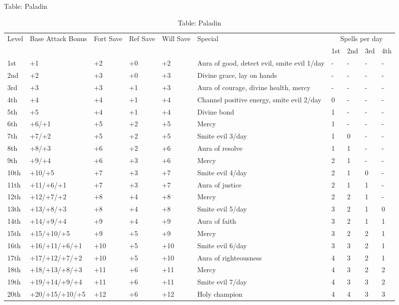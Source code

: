 Table: Paladin
\begin{table}[]
\sffamily
\caption{Table: Paladin}
\begin{tabularx}{\linewidth}{lllllXllll}
\multirow{2}{*}{Level} & \multirow{2}{*}{\parbox{5em}{Base Attack Bonus}} & \multirow{2}{*}{\parbox{1.5em}{Fort Save}} & \multirow{2}{*}{\parbox{1.5em}{Ref Save}} & \multirow{2}{*}{\parbox{1.5em}{Will Save}} & \multirow{2}{*}{Special}  & \multicolumn{4}{c}{Spells per day} \\
                       &                                    &                            &                           &                            &                                                                        & 1st  & 2nd & 3rd & 4th \\
\hline
1st & +1 & +2 & +0 & +2 & Aura of good, detect evil, smite evil 1/day & - & - & - & -\\
2nd & +2 & +3 & +0 & +3 & Divine grace, lay on hands & - & - & - & -\\
3rd & +3 & +3 & +1 & +3 & Aura of courage, divine health, mercy & - & - & - & -\\
4th & +4 & +4 & +1 & +4 & Channel positive energy, smite evil 2/day & 0 & - & - & -\\
5th & +5 & +4 & +1 & +4 & Divine bond & 1 & - & - & -\\
6th & +6/+1 & +5 & +2 & +5 & Mercy & 1 & - & - & -\\
7th & +7/+2 & +5 & +2 & +5 & Smite evil 3/day & 1 & 0 & - & -\\
8th & +8/+3 & +6 & +2 & +6 & Aura of resolve & 1 & 1 & - & -\\
9th & +9/+4 & +6 & +3 & +6 & Mercy & 2 & 1 & - & -\\
10th & +10/+5 & +7 & +3 & +7 & Smite evil 4/day & 2 & 1 & 0 & -\\
11th & +11/+6/+1 & +7 & +3 & +7 & Aura of justice & 2 & 1 & 1 & -\\
12th & +12/+7/+2 & +8 & +4 & +8 & Mercy & 2 & 2 & 1 & -\\
13th & +13/+8/+3 & +8 & +4 & +8 & Smite evil 5/day & 3 & 2 & 1 & 0\\
14th & +14/+9/+4 & +9 & +4 & +9 & Aura of faith & 3 & 2 & 1 & 1\\
15th & +15/+10/+5 & +9 & +5 & +9 & Mercy & 3 & 2 & 2 & 1\\
16th & +16/+11/+6/+1 & +10 & +5 & +10 & Smite evil 6/day & 3 & 3 & 2 & 1\\
17th & +17/+12/+7/+2 & +10 & +5 & +10 & Aura of righteousness & 4 & 3 & 2 & 1\\
18th & +18/+13/+8/+3 & +11 & +6 & +11 & Mercy & 4 & 3 & 2 & 2\\
19th & +19/+14/+9/+4 & +11 & +6 & +11 & Smite evil 7/day & 4 & 3 & 3 & 2\\
20th & +20/+15/+10/+5 & +12 & +6 & +12 & Holy champion & 4 & 4 & 3 & 3\\
\end{tabularx}
\end{table}

